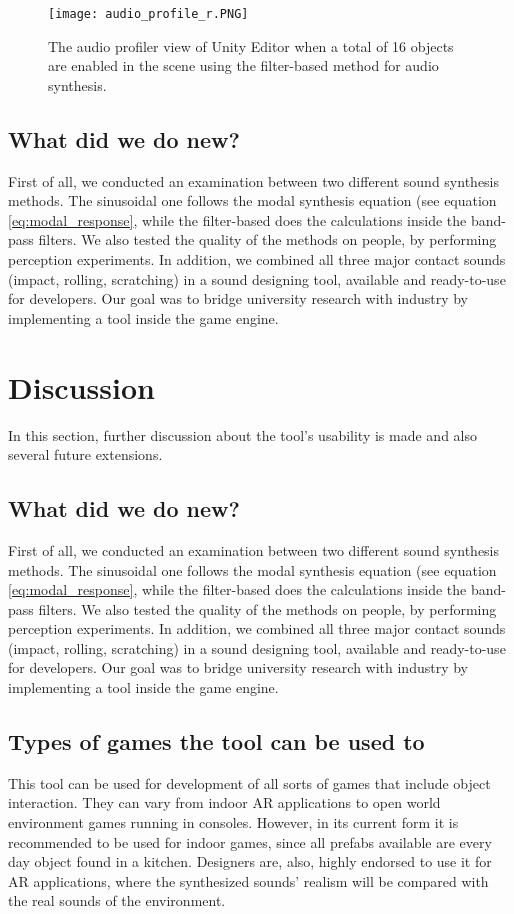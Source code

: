 \begin{figure}[H]
  \centering
    \texttt{[image: audio\_profile\_r.PNG]}
      \caption{The audio profiler view of Unity\textsuperscript{\textregistered} Editor when a total of 16 objects are enabled in the scene using the filter-based method for audio synthesis.}
      \label{fig:audio_profile}
\end{figure}

\subsection{What did we do new?}
First of all, we conducted an examination between two different sound synthesis methods. The sinusoidal one follows the modal synthesis equation (see equation \ref{eq:modal_response}, while the filter-based does the calculations inside the band-pass filters. We also tested the quality of the methods on people, by performing perception experiments. In addition, we combined all three major contact sounds (impact, rolling, scratching) in a sound designing tool, available and ready-to-use for developers. Our goal was to bridge university research with industry by implementing a tool inside the game engine.

\section{Discussion}
In this section, further discussion about the tool's usability is made and also several future extensions.

\subsection{What did we do new?}
First of all, we conducted an examination between two different sound synthesis methods. The sinusoidal one follows the modal synthesis equation (see equation \ref{eq:modal_response}, while the filter-based does the calculations inside the band-pass filters. We also tested the quality of the methods on people, by performing perception experiments. In addition, we combined all three major contact sounds (impact, rolling, scratching) in a sound designing tool, available and ready-to-use for developers. Our goal was to bridge university research with industry by implementing a tool inside the game engine.

\subsection{Types of games the tool can be used to}
This tool can be used for development of all sorts of games that include object interaction. They can vary from indoor AR applications to open world environment games running in consoles. However, in its current form it is recommended to be used for indoor games, since all prefabs available are every day object found in a kitchen. Designers are, also, highly endorsed to use it for \gls{AR} applications, where the synthesized sounds' realism will be compared with the real sounds of the environment.

